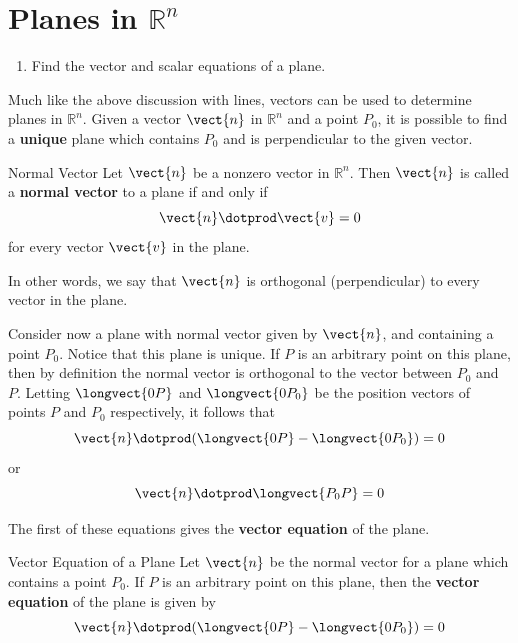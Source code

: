 \pagebreak
\section{Planes in $\mathbb{R}^n$}

\begin{outcome}

\begin{enumerate}

\item[A.] Find the vector and scalar equations of a plane.

\end{enumerate}
\end{outcome}

Much like the above discussion with lines, vectors can be used to determine planes in $\mathbb{R}^n$. Given a vector $\vect{n}$ in $\mathbb{R}^n$ and a point $P_0$, it is possible to find a \textbf{unique} plane which contains $P_0$ and is perpendicular to the given vector. 

\begin{definition}{Normal Vector}\label{def:normalvector}
Let $\vect{n}$ be a nonzero vector in $\mathbb{R}^n$. Then $\vect{n}$ is called a \textbf{normal vector} to a plane if and only if 
\[
\vect{n} \dotprod \vect{v} = 0
\]
for every vector $\vect{v}$ in the plane. 
\end{definition}

In other words, we say that $\vect{n}$ is orthogonal (perpendicular) to every vector in the plane. 

Consider now a plane with normal vector given by $\vect{n}$, and containing a point $P_0$. Notice that this plane is unique. If $P$ is an arbitrary point on this plane, then by definition the normal vector is orthogonal to the vector between $P_0$ and $P$. Letting $\longvect{0P}$ and $\longvect{0P_0}$ be the position vectors of points $P$ and $P_0$ respectively, it follows that 
\[
\vect{n} \dotprod (\longvect{0P} - \longvect{0P_0}) = 0 
\]
or
\[
\vect{n} \dotprod \longvect{P_0P} = 0 
\]

The first of these equations gives the \textbf{vector equation} of the plane. 

\begin{definition}{Vector Equation of a Plane}\label{def:vecteqnplane}
Let $\vect{n}$ be the normal vector for a plane which contains a point $P_0$. If $P$ is an arbitrary point on this plane, then the  \textbf{vector equation} of the plane is given by 
\[
\vect{n} \dotprod (\longvect{0P} - \longvect{0P_0}) = 0
\]
\end{definition}

